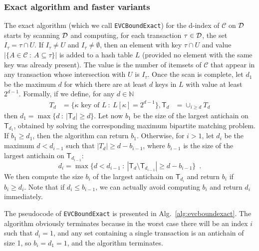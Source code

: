 \subsubsection{Exact algorithm and faster variants}\label{sec:computvcexact}
The exact algorithm (which we call \texttt{EVCBoundExact}) for the d-index of
$\mathcal{C}$ on ${\cal D}$ starts by scanning ${\cal D}$ and computing, for each
transaction $\tau\in{\cal D}$, the set $I_\tau=\tau\cap U$. If $I_\tau\neq U$ and
$I_\tau\neq\emptyset$, then an element with key $\tau\cap U$ and value
$|\{A\in\mathcal{C} ~:~ A\subseteq\tau\}|$ is added to a hash table $L$
(provided no element with the same key was already present). The value is the
number of itemsets of $\mathcal{C}$ that appear in any transaction whose
intersection with $U$ is $I_\tau$. Once the scan is complete, let $d_1$ be the
maximum $d$ for which there are at least $d$ keys in $L$ with value at least
$2^{d-1}$. Formally, if we define, for any
$d\in\mathbb{N}$
\begin{align*}
	T_d&=\{\kappa \mbox{ key of } L ~:~ L[\kappa]= 2^{d-1}\},
	\mathsf{T}_d&=\cup_{i\ge d} T_d
\end{align*}
then $d_1=\max\{d ~:~ |\mathsf{T}_d|\ge d\}$.
Let now $b_1$ be the size of the largest antichain on $\mathsf{T}_{d_1}$,
obtained by solving the corresponding maximum bipartite matching problem. If
$b_1\ge d_1$, then the algorithm can return $b_1$. Otherwise, for $i>1$, let
$d_i$ be the maximum $d<d_{i-1}$ such that $|T_d|\ge d-b_{i-1}$,
where $b_{i-1}$ is the size of the largest antichain on $\mathsf{T}_{d_{i-1}}$:
\[
	d_i=\max\{d<d_{i-1} ~:~ |\mathsf{T}_d\setminus\mathsf{T}_{d_{i-1}}|\ge d-b_{i-1}\}\enspace.
\]
We then compute the size $b_i$ of the largest antichain on $\mathsf{T}_{d_i}$
and return $b_i$ if $b_i\ge d_i$. Note that if $d_i\le b_{i-1}$, we can actually
avoid computing $b_i$ and return $d_i$ immediately.

The pseudocode of \texttt{EVCBoundExact} is presented in
Alg.~\ref{alg:evcboundexact}. The algorithm obviously terminates because in the
worst case there will be an index $i$ such that $d_i=1$, and any set containing
a single transaction is an antichain of size 1, so $b_i=d_1=1$, and the
algorithm terminates.

